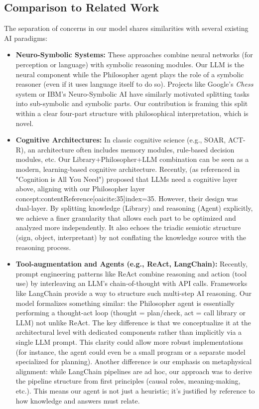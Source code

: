 \documentclass{article}
\begin{document}
\subsection{Comparison to Related Work}
The separation of concerns in our model shares similarities with several existing AI paradigms:
\begin{itemize}
    \item \textbf{Neuro-Symbolic Systems:} These approaches combine neural networks (for perception or language) with symbolic reasoning modules. Our LLM is the neural component while the Philosopher agent plays the role of a symbolic reasoner (even if it uses language itself to do so). Projects like Google’s \emph{Chess} system or IBM’s Neuro-Symbolic AI have similarly motivated splitting tasks into sub-symbolic and symbolic parts. Our contribution is framing this split within a clear four-part structure with philosophical interpretation, which is novel.
    \item \textbf{Cognitive Architectures:} In classic cognitive science (e.g., SOAR, ACT-R), an architecture often includes memory modules, rule-based decision modules, etc. Our Library+Philosopher+LLM combination can be seen as a modern, learning-based cognitive architecture. Recently, \cite{Spivack2024CogAI} (as referenced in "Cognition is All You Need") proposed that LLMs need a cognitive layer above, aligning with our Philosopher layer concept:contentReference[oaicite:35]{index=35}. However, their design was dual-layer. By splitting knowledge (Library) and reasoning (Agent) explicitly, we achieve a finer granularity that allows each part to be optimized and analyzed more independently. It also echoes the triadic semiotic structure (sign, object, interpretant) by not conflating the knowledge source with the reasoning process.
    \item \textbf{Tool-augmentation and Agents (e.g., ReAct, LangChain):} Recently, prompt engineering patterns like ReAct combine reasoning and action (tool use) by interleaving an LLM's chain-of-thought with API calls. Frameworks like LangChain provide a way to structure such multi-step AI reasoning. Our model formalizes something similar: the Philosopher agent is essentially performing a thought-act loop (thought = plan/check, act = call library or LLM) not unlike ReAct. The key difference is that we conceptualize it at the architectural level with dedicated components rather than implicitly via a single LLM prompt. This clarity could allow more robust implementations (for instance, the agent could even be a small program or a separate model specialized for planning). Another difference is our emphasis on metaphysical alignment: while LangChain pipelines are ad hoc, our approach was to derive the pipeline structure from first principles (causal roles, meaning-making, etc.). This means our agent is not just a heuristic; it's justified by reference to how knowledge and answers must relate.
\end{itemize}
\end{document}
